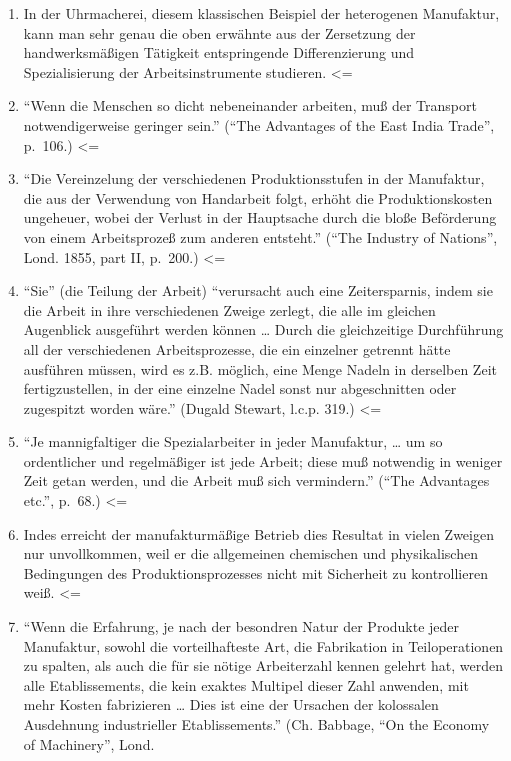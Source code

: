 {\begin{enumerate}
\item
  In der Uhrmacherei, diesem klassischen Beispiel der heterogenen
  Manufaktur, kann man sehr genau die oben erwähnte aus der Zersetzung
  der handwerksmäßigen Tätigkeit entspringende Differenzierung und
  Spezialisierung der Arbeitsinstrumente studieren. \textless{}=
\item
  ``Wenn die Menschen so dicht nebeneinander arbeiten, muß der Transport
  notwendigerweise geringer sein.'' (``The Advantages of the East India
  Trade'', p.~106.) \textless{}=
\item
  ``Die Vereinzelung der verschiedenen Produktionsstufen in der
  Manufaktur, die aus der Verwendung von Handarbeit folgt, erhöht die
  Produktionskosten ungeheuer, wobei der Verlust in der Hauptsache durch
  die bloße Beförderung von einem Arbeitsprozeß zum anderen entsteht.''
  (``The Industry of Nations'', Lond. 1855, part II, p.~200.)
  \textless{}=
\item
  ``Sie'' (die Teilung der Arbeit) ``verursacht auch eine Zeitersparnis,
  indem sie die Arbeit in ihre verschiedenen Zweige zerlegt, die alle im
  gleichen Augenblick ausgeführt werden können \ldots{} Durch die
  gleichzeitige Durchführung all der verschiedenen Arbeitsprozesse, die
  ein einzelner getrennt hätte ausführen müssen, wird es z.B. möglich,
  eine Menge Nadeln in derselben Zeit fertigzustellen, in der eine
  einzelne Nadel sonst nur abgeschnitten oder zugespitzt worden wäre.''
  (Dugald Stewart, l.c.p. 319.) \textless{}=
\item
  ``Je mannigfaltiger die Spezialarbeiter in jeder Manufaktur, \ldots{}
  um so ordentlicher und regelmäßiger ist jede Arbeit; diese muß
  notwendig in weniger Zeit getan werden, und die Arbeit muß sich
  vermindern.'' (``The Advantages etc.'', p.~68.) \textless{}=
\item
  Indes erreicht der manufakturmäßige Betrieb dies Resultat in vielen
  Zweigen nur unvollkommen, weil er die allgemeinen chemischen und
  physikalischen Bedingungen des Produktionsprozesses nicht mit
  Sicherheit zu kontrollieren weiß. \textless{}=
\item
  ``Wenn die Erfahrung, je nach der besondren Natur der Produkte jeder
  Manufaktur, sowohl die vorteilhafteste Art, die Fabrikation in
  Teiloperationen zu spalten, als auch die für sie nötige Arbeiterzahl
  kennen gelehrt hat, werden alle Etablissements, die kein exaktes
  Multipel dieser Zahl anwenden, mit mehr Kosten fabrizieren \ldots{}
  Dies ist eine der Ursachen der kolossalen Ausdehnung industrieller
  Etablissements.'' (Ch. Babbage, ``On the Economy of Machinery'', Lond.

\end{enumerate}}

